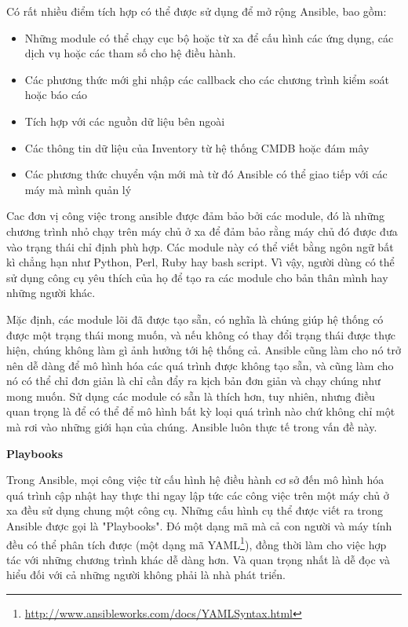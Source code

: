 Có rất nhiều điểm tích hợp có thể được sử dụng để mở rộng Ansible, bao gồm:

\begin{itemize}
\item Những module có thể chạy cục bộ hoặc từ xa để cấu hình các ứng dụng, các dịch vụ hoặc các tham số cho hệ điều hành.
\item Các phương thức mới ghi nhập các callback cho các chương trình kiểm soát hoặc báo cáo
\item Tích hợp với các nguồn dữ liệu bên ngoài
\item Các thông tin dữ liệu của Inventory từ hệ thống CMDB hoặc đám mây
\item Các phương thức chuyển vận mới mà từ đó Ansible có thể giao tiếp với các máy mà mình quản lý
\end{itemize}

Cac đơn vị công việc trong ansible được đảm bảo bởi các module, đó là những chương trình nhỏ chạy trên máy chủ ở xa để đảm bảo rằng máy chủ đó được đưa vào trạng thái chỉ định phù hợp. Các module này có thể viết bằng ngôn ngữ bất kì chẳng hạn như Python, Perl, Ruby hay bash script. Vì vậy, người dùng có thể sử dụng công cụ yêu thích của họ để tạo ra các module cho bản thân mình hay những người khác.

Mặc định, các module lõi đã được tạo sẵn, có nghĩa là chúng giúp hệ thống có được một trạng thái mong muốn, và nếu không có thay đổi trạng thái được thực hiện, chúng không làm gì ảnh hưởng tới hệ thống cả. Ansible cũng làm cho nó trở nên dễ dàng để mô hình hóa các quá trình được không tạo sẵn, và cũng làm cho nó có thể chỉ đơn giản là chỉ cần đẩy ra kịch bản đơn giản và chạy chúng như mong muốn. Sử dụng các module có sẵn là thích hơn, tuy nhiên, nhưng điều quan trọng là để có thể để mô hình bất kỳ loại quá trình nào chứ không chỉ một mà rơi vào những giới hạn của chúng. Ansible luôn thực tế trong vấn đề này.


\textbf{\large Playbooks}


Trong Ansible, mọi công việc từ cấu hình hệ điều hành cơ sở đến mô hình hóa quá trình cập nhật hay thực thi ngay lập tức các công việc trên một máy chủ ở xa đều sử dụng chung một công cụ. Những cấu hình cụ thể được viết ra trong Ansible được gọi là "Playbooks". Đó một dạng mã mà cả con người và máy tính đều có thể phân tích được (một dạng mã YAML\footnote{\url{http://www.ansibleworks.com/docs/YAMLSyntax.html}}), đồng thời làm cho việc hợp tác với những chương trình khác dễ dàng hơn. Và quan trọng nhất là dễ đọc và hiểu đối với cả những người không phải là nhà phát triển.

